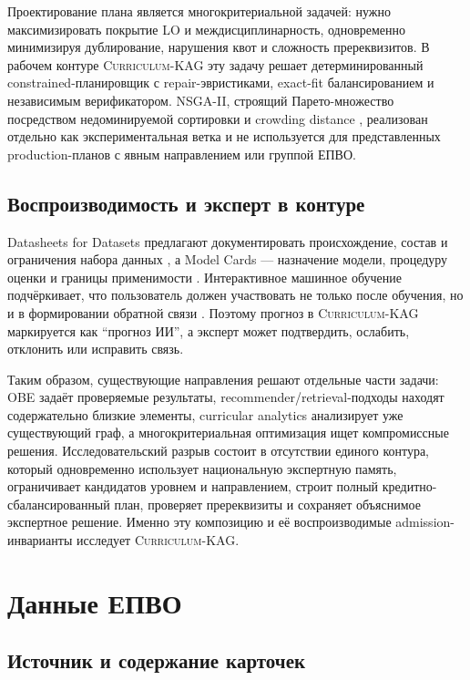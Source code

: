 \documentclass[twoside,11pt]{article}
\newcommand{\systemname}{\textsc{Curriculum-KAG}}
\begin{document}
Проектирование плана является многокритериальной задачей: нужно максимизировать покрытие LO и междисциплинарность, одновременно минимизируя дублирование, нарушения квот и сложность пререквизитов. В рабочем контуре \systemname{} эту задачу решает детерминированный constrained-планировщик с repair-эвристиками, exact-fit балансированием и независимым верификатором. NSGA-II, строящий Парето-множество посредством недоминируемой сортировки и crowding distance \cite{Deb2002}, реализован отдельно как экспериментальная ветка и не используется для представленных production-планов с явным направлением или группой ЕПВО.

\subsection{Воспроизводимость и эксперт в контуре}

Datasheets for Datasets предлагают документировать происхождение, состав и ограничения набора данных \cite{Gebru2021}, а Model Cards --- назначение модели, процедуру оценки и границы применимости \cite{Mitchell2019}. Интерактивное машинное обучение подчёркивает, что пользователь должен участвовать не только после обучения, но и в формировании обратной связи \cite{Amershi2014}. Поэтому прогноз в \systemname{} маркируется как ``прогноз ИИ'', а эксперт может подтвердить, ослабить, отклонить или исправить связь.

Таким образом, существующие направления решают отдельные части задачи: OBE задаёт проверяемые результаты, recommender/retrieval-подходы находят содержательно близкие элементы, curricular analytics анализирует уже существующий граф, а многокритериальная оптимизация ищет компромиссные решения. Исследовательский разрыв состоит в отсутствии единого контура, который одновременно использует национальную экспертную память, ограничивает кандидатов уровнем и направлением, строит полный кредитно-сбалансированный план, проверяет пререквизиты и сохраняет объяснимое экспертное решение. Именно эту композицию и её воспроизводимые admission-инварианты исследует \systemname{}.

\section{Данные ЕПВО}

\subsection{Источник и содержание карточек}
\end{document}
